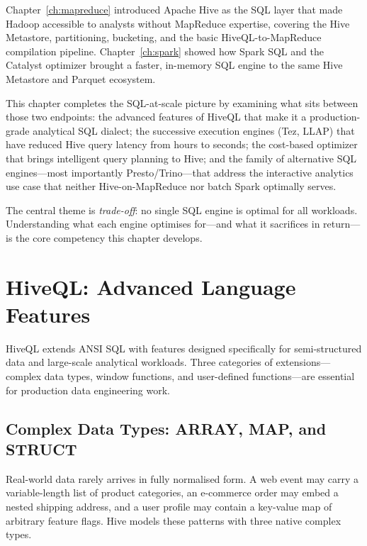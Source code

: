 \bigskip

Chapter~\ref{ch:mapreduce} introduced Apache Hive as the SQL layer that
made Hadoop accessible to analysts without MapReduce expertise, covering
the Hive Metastore, partitioning, bucketing, and the basic HiveQL-to-MapReduce
compilation pipeline. Chapter~\ref{ch:spark} showed how Spark SQL and the
Catalyst optimizer brought a faster, in-memory SQL engine to the same Hive
Metastore and Parquet ecosystem.

This chapter completes the SQL-at-scale picture by examining what sits
between those two endpoints: the advanced features of HiveQL that make
it a production-grade analytical SQL dialect; the successive execution
engines (Tez, LLAP) that have reduced Hive query latency from hours to
seconds; the cost-based optimizer that brings intelligent query planning
to Hive; and the family of alternative SQL engines---most importantly
Presto/Trino---that address the interactive analytics use case that neither
Hive-on-MapReduce nor batch Spark optimally serves.

The central theme is \emph{trade-off}: no single SQL engine is optimal
for all workloads. Understanding what each engine optimises for---and
what it sacrifices in return---is the core competency this chapter develops.

\section{HiveQL: Advanced Language Features}
\label{sec:hiveql-advanced}

HiveQL extends ANSI SQL with features designed specifically for
semi-structured data and large-scale analytical workloads. Three categories
of extensions---complex data types, window functions, and user-defined
functions---are essential for production data engineering work.

\subsection{Complex Data Types: ARRAY, MAP, and STRUCT}
\label{subsec:complex-types}

Real-world data rarely arrives in fully normalised form. A web event
may carry a variable-length list of product categories, an e-commerce
order may embed a nested shipping address, and a user profile may contain
a key-value map of arbitrary feature flags. Hive models these patterns
with three native complex types.

